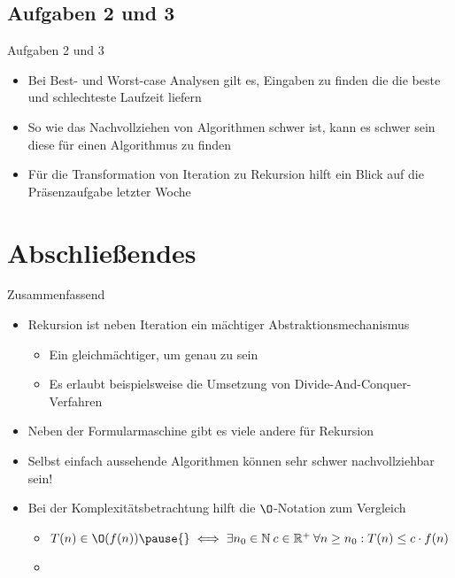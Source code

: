\subsection{Aufgaben 2 und 3}
\begin{frame}{Aufgaben 2 und 3}
\begin{itemize}[<+(1)->]
    \itemsep12pt
    \item Bei Best- und Worst-case Analysen gilt es, Eingaben zu finden die die beste und schlechteste Laufzeit liefern
    \item So wie das Nachvollziehen von Algorithmen schwer ist, kann es schwer sein diese für einen Algorithmus zu finden 
    \item Für die Transformation von Iteration zu Rekursion hilft ein Blick auf die Präsenzaufgabe letzter Woche
\end{itemize}
\end{frame}
\fi

\section{Abschließendes}
{\SummaryFrame
\begin{frame}[t]{Zusammenfassend}
\pause \printBibCommand
\vfill\vfill %
\begin{itemize}[<+(1)->]
    \itemsep6.5pt
    \item Rekursion ist neben Iteration ein mächtiger Abstraktionsmechanismus \begin{itemize}
        \item Ein gleichmächtiger, um genau zu sein
        \item Es erlaubt beispielsweise die Umsetzung von Divide-And-Conquer-Verfahren
    \end{itemize}
    \item Neben der Formularmaschine gibt es viele andere  für Rekursion
    \item Selbst einfach aussehende Algorithmen können sehr schwer nachvollziehbar sein!
    \item Bei der Komplexitätsbetrachtung hilft die \(\O\)-Notation zum Vergleich \begin{itemize}
        \item \(T(n) \in \O(f(n))\pause{}\iff \exists n_0 \in \mathbb{N}\: c \in \mathbb{R}^+\: \forall n \geq n_0: T(n) \leq c \cdot f(n)\)
        \item {}
    \end{itemize}
\end{itemize}
\end{frame}
}

